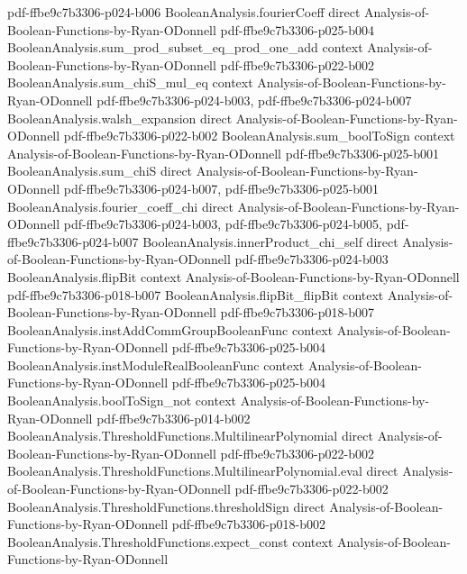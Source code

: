 \begin{theorem}
{    pdf-ffbe9c7b3306-p024-b006}
\proofstep
  {BooleanAnalysis.fourierCoeff}
  {direct}
  {Analysis-of-Boolean-Functions-by-Ryan-ODonnell}
  {pdf-ffbe9c7b3306-p025-b004}
\proofstep
  {BooleanAnalysis.sum_prod_subset_eq_prod_one_add}
  {context}
  {Analysis-of-Boolean-Functions-by-Ryan-ODonnell}
  {pdf-ffbe9c7b3306-p022-b002}
\proofstep
  {BooleanAnalysis.sum_chiS_mul_eq}
  {context}
  {Analysis-of-Boolean-Functions-by-Ryan-ODonnell}
  {pdf-ffbe9c7b3306-p024-b003,
    pdf-ffbe9c7b3306-p024-b007}
\proofstep
  {BooleanAnalysis.walsh_expansion}
  {direct}
  {Analysis-of-Boolean-Functions-by-Ryan-ODonnell}
  {pdf-ffbe9c7b3306-p022-b002}
\proofstep
  {BooleanAnalysis.sum_boolToSign}
  {context}
  {Analysis-of-Boolean-Functions-by-Ryan-ODonnell}
  {pdf-ffbe9c7b3306-p025-b001}
\proofstep
  {BooleanAnalysis.sum_chiS}
  {direct}
  {Analysis-of-Boolean-Functions-by-Ryan-ODonnell}
  {pdf-ffbe9c7b3306-p024-b007,
    pdf-ffbe9c7b3306-p025-b001}
\proofstep
  {BooleanAnalysis.fourier_coeff_chi}
  {direct}
  {Analysis-of-Boolean-Functions-by-Ryan-ODonnell}
  {pdf-ffbe9c7b3306-p024-b003,
    pdf-ffbe9c7b3306-p024-b005,
    pdf-ffbe9c7b3306-p024-b007}
\proofstep
  {BooleanAnalysis.innerProduct_chi_self}
  {direct}
  {Analysis-of-Boolean-Functions-by-Ryan-ODonnell}
  {pdf-ffbe9c7b3306-p024-b003}
\proofstep
  {BooleanAnalysis.flipBit}
  {context}
  {Analysis-of-Boolean-Functions-by-Ryan-ODonnell}
  {pdf-ffbe9c7b3306-p018-b007}
\proofstep
  {BooleanAnalysis.flipBit_flipBit}
  {context}
  {Analysis-of-Boolean-Functions-by-Ryan-ODonnell}
  {pdf-ffbe9c7b3306-p018-b007}
\proofstep
  {BooleanAnalysis.instAddCommGroupBooleanFunc}
  {context}
  {Analysis-of-Boolean-Functions-by-Ryan-ODonnell}
  {pdf-ffbe9c7b3306-p025-b004}
\proofstep
  {BooleanAnalysis.instModuleRealBooleanFunc}
  {context}
  {Analysis-of-Boolean-Functions-by-Ryan-ODonnell}
  {pdf-ffbe9c7b3306-p025-b004}
\proofstep
  {BooleanAnalysis.boolToSign_not}
  {context}
  {Analysis-of-Boolean-Functions-by-Ryan-ODonnell}
  {pdf-ffbe9c7b3306-p014-b002}
\proofstep
  {BooleanAnalysis.ThresholdFunctions.MultilinearPolynomial}
  {direct}
  {Analysis-of-Boolean-Functions-by-Ryan-ODonnell}
  {pdf-ffbe9c7b3306-p022-b002}
\proofstep
  {BooleanAnalysis.ThresholdFunctions.MultilinearPolynomial.eval}
  {direct}
  {Analysis-of-Boolean-Functions-by-Ryan-ODonnell}
  {pdf-ffbe9c7b3306-p022-b002}
\proofstep
  {BooleanAnalysis.ThresholdFunctions.thresholdSign}
  {direct}
  {Analysis-of-Boolean-Functions-by-Ryan-ODonnell}
  {pdf-ffbe9c7b3306-p018-b002}
\proofstep
  {BooleanAnalysis.ThresholdFunctions.expect_const}
  {context}
  {Analysis-of-Boolean-Functions-by-Ryan-ODonnell}

\end{theorem}
